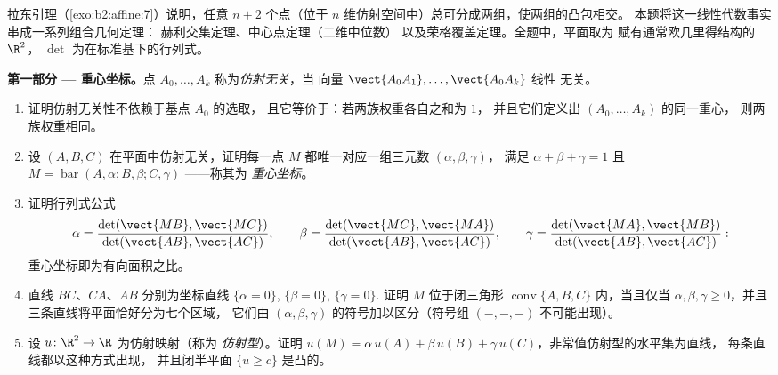\begin{problem}\label{pb:b2:affine:1}
拉东引理（\cref{exo:b2:affine:7}）说明，任意 $n + 2$
个点（位于 $n$ 维仿射空间中）总可分成两组，使两组的凸包相交。
本题将这一线性代数事实
串成一系列组合几何定理：
赫利交集定理、中心点定理（二维中位数）
以及荣格覆盖定理。全题中，平面取为
赋有通常欧几里得结构的 $\R^2$，
$\det$ 为在标准基下的行列式。

\medskip
\noindent\textbf{第一部分 --- 重心坐标。}点
$A_0, \dots, A_k$ 称为\emph{仿射无关}，当
向量 $\vect{A_0A_1}, \dots, \vect{A_0A_k}$ 线性
无关。
\begin{enumerate}
  \item 证明仿射无关性不依赖于基点 $A_0$ 的选取，
        且它等价于：若两族权重各自之和为 $1$，
        并且它们定义出 $(A_0,
        \dots, A_k)$ 的同一重心，
        则两族权重相同。
  \item 设 $(A, B, C)$ 在平面中仿射无关，证明每一点 $M$
        都唯一对应一组三元数 $(\alpha, \beta, \gamma)$，
        满足 $\alpha + \beta +
        \gamma = 1$ 且 $M = \operatorname{bar}(A, \alpha; B,
        \beta; C, \gamma)$ ——称其为\emph{
        重心坐标}。
  \item 证明行列式公式
        \[
        \alpha = \frac{\det(\vect{MB},
        \vect{MC})}{\det(\vect{AB}, \vect{AC})},
        \qquad
        \beta = \frac{\det(\vect{MC},
        \vect{MA})}{\det(\vect{AB}, \vect{AC})},
        \qquad
        \gamma = \frac{\det(\vect{MA},
        \vect{MB})}{\det(\vect{AB}, \vect{AC})} :
        \]
        重心坐标即为有向面积之比。
  \item 直线 $BC$、$CA$、$AB$ 分别为坐标直线
        $\{\alpha = 0\}$, $\{\beta = 0\}$, $\{\gamma = 0\}$.
        证明 $M$ 位于闭三角形
        $\operatorname{conv}\{A, B, C\}$ 内，当且仅当 $\alpha, \beta,
        \gamma \geq 0$，并且三条直线将平面恰好分为七个区域，
        它们由
        $(\alpha, \beta, \gamma)$ 的符号加以区分（符号组 $(-, -,
        -)$ 不可能出现）。
  \item 设 $u \colon \R^2 \to \R$ 为仿射映射（称为
        \emph{仿射型}）。证明 $u(M) = \alpha\,u(A) +
        \beta\,u(B) + \gamma\,u(C)$，非常值仿射型的水平集为直线，
        每条直线都以这种方式出现，
        并且闭半平面 $\{u
        \geq c\}$ 是凸的。
\end{enumerate}


\end{problem}
